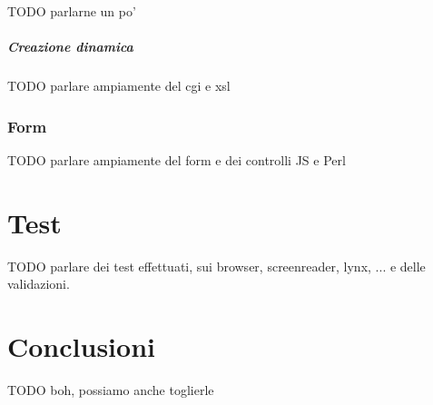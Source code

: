 \documentclass[10pt,a4paper,onecolumn]{article}
\begin{document}
TODO parlarne un po'

\subparagraph{Creazione dinamica}

TODO parlare ampiamente del cgi e xsl

\subsubsection{Form}

TODO parlare ampiamente del form e dei controlli JS e Perl

\clearpage

\section{Test}

TODO parlare dei test effettuati, sui browser, screenreader, lynx, ... e delle validazioni.

\section{Conclusioni}

TODO boh, possiamo anche toglierle
\end{document}
